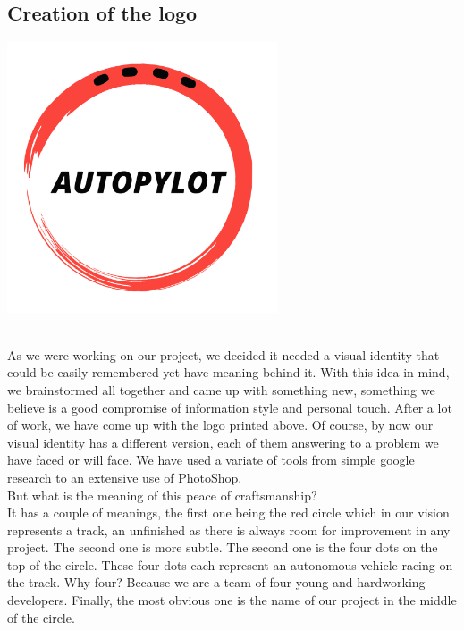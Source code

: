 \documentclass[12pt]{article}
\begin{document}
\subsection{Creation of the logo}
\centerline{\includegraphics[height=8cm]{../../logos/logo-transparent-black.png}}\\
As we were working on our project, we decided it needed a visual identity that could be easily remembered yet have meaning behind it. With this idea in mind, we brainstormed all together and came up with something new, something we believe is a good compromise of information style and personal touch. After a lot of work, we have come up with the logo printed above. Of course, by now our visual identity has a different version, each of them answering to a problem we have faced or will face. We have used a variate of tools from simple google research to an extensive use of PhotoShop.  \\

But what is the meaning of this peace of craftsmanship?\\

It has a couple of meanings, the first one being the red circle which in our vision represents a track, an unfinished as there is always room for improvement in any project. The second one is more subtle. The second one is the four dots on the top of the circle. These four dots each represent an autonomous vehicle racing on the track. Why four? Because we are a team of four young and hardworking developers. Finally, the most obvious one is the name of our project in the middle of the circle. 

\end{document}
